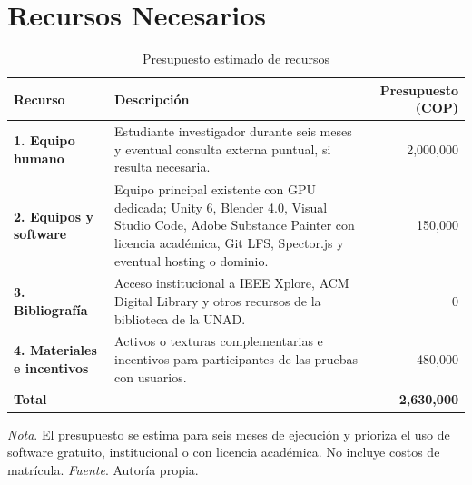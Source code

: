 \section{Recursos Necesarios}

\begin{table}[H]
\caption{Presupuesto estimado de recursos}
\centering
\footnotesize
\setlength{\tabcolsep}{4pt}
\begin{tabularx}{\textwidth}{>{\RaggedRight\arraybackslash}p{3.2cm}>{\RaggedRight\arraybackslash}Xr}
\hline
\textbf{Recurso} & \textbf{Descripci\'on} & \textbf{Presupuesto (COP)} \\ \hline
\textbf{1. Equipo humano} & Estudiante investigador durante seis meses y eventual consulta externa puntual, si resulta necesaria. & 2,000,000 \\
\textbf{2. Equipos y software} & Equipo principal existente con GPU dedicada; Unity 6, Blender 4.0, Visual Studio Code, Adobe Substance Painter con licencia acad\'emica, Git LFS, Spector.js y eventual hosting o dominio. & 150,000 \\
\textbf{3. Bibliograf\'ia} & Acceso institucional a IEEE Xplore, ACM Digital Library y otros recursos de la biblioteca de la UNAD. & 0 \\
\textbf{4. Materiales e incentivos} & Activos o texturas complementarias e incentivos para participantes de las pruebas con usuarios. & 480,000 \\
\textbf{Total} & & \textbf{2,630,000} \\ \hline
\end{tabularx}
\par\vspace{0.5\baselineskip}
\textit{Nota}. El presupuesto se estima para seis meses de ejecuci\'on y prioriza el uso de software gratuito, institucional o con licencia acad\'emica. No incluye costos de matr\'icula. \textit{Fuente}. Autor\'ia propia.
\setlength{\tabcolsep}{6pt}
\end{table}

\newpage
